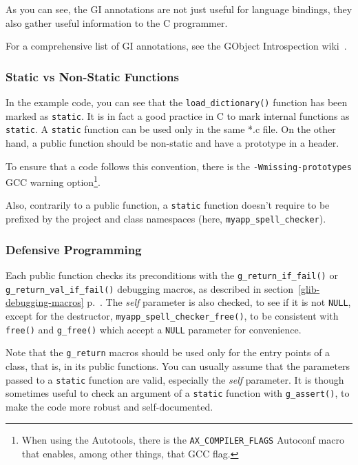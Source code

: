 As you can see, the GI annotations are not just useful for language bindings, they also gather useful information to the C programmer.

For a comprehensive list of GI annotations, see the GObject Introspection wiki~\cite{gobject-introspection}.

\subsubsection{Static vs Non-Static Functions}
In the example code, you can see that the \lstinline{load_dictionary()} function has been marked as \lstinline{static}. It is in fact a good practice in C to mark internal functions as \lstinline{static}. A \lstinline{static} function can be used only in the same *.c file. On the other hand, a public function should be non-static and have a prototype in a header.

To ensure that a code follows this convention, there is the \texttt{-Wmissing-prototypes} GCC warning option\footnote{When using the Autotools, there is the \texttt{AX\_COMPILER\_FLAGS} Autoconf macro that enables, among other things, that GCC flag.}.

Also, contrarily to a public function, a \lstinline{static} function doesn't require to be prefixed by the project and class namespaces (here, \lstinline{myapp_spell_checker}).

\subsubsection{Defensive Programming}
Each public function checks its preconditions with the \lstinline{g_return_if_fail()} or \lstinline{g_return_val_if_fail()} debugging macros, as described in section~\ref{glib-debugging-macros} p.~\pageref{glib-debugging-macros}. The \emph{self} parameter is also checked, to see if it is not \lstinline{NULL}, except for the destructor, \lstinline{myapp_spell_checker_free()}, to be consistent with \lstinline{free()} and \lstinline{g_free()} which accept a \lstinline{NULL} parameter for convenience.

Note that the \lstinline{g_return} macros should be used only for the entry points of a class, that is, in its public functions. You can usually assume that the parameters passed to a \lstinline{static} function are valid, especially the \emph{self} parameter. It is though sometimes useful to check an argument of a \lstinline{static} function with \lstinline{g_assert()}, to make the code more robust and self-documented.


